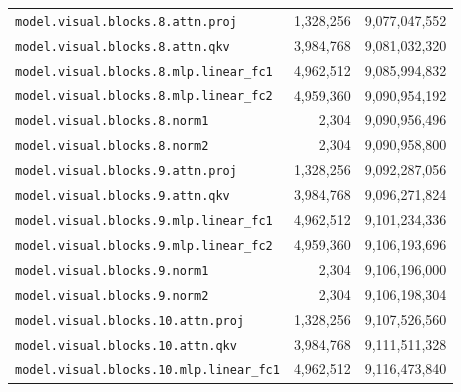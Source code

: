 \documentclass[10pt,a4paper]{article}
\theoremstyle{definition}
\begin{document}
\begin{appendices}
\begin{longtable}{p{9.5cm}rr}
\texttt{model.\allowbreak{}visual.\allowbreak{}blocks.\allowbreak{}8.\allowbreak{}attn.\allowbreak{}proj} & 1,328,256 & 9,077,047,552 \\
\texttt{model.\allowbreak{}visual.\allowbreak{}blocks.\allowbreak{}8.\allowbreak{}attn.\allowbreak{}qkv} & 3,984,768 & 9,081,032,320 \\
\texttt{model.\allowbreak{}visual.\allowbreak{}blocks.\allowbreak{}8.\allowbreak{}mlp.\allowbreak{}linear\_fc1} & 4,962,512 & 9,085,994,832 \\
\texttt{model.\allowbreak{}visual.\allowbreak{}blocks.\allowbreak{}8.\allowbreak{}mlp.\allowbreak{}linear\_fc2} & 4,959,360 & 9,090,954,192 \\
\texttt{model.\allowbreak{}visual.\allowbreak{}blocks.\allowbreak{}8.\allowbreak{}norm1} & 2,304 & 9,090,956,496 \\
\texttt{model.\allowbreak{}visual.\allowbreak{}blocks.\allowbreak{}8.\allowbreak{}norm2} & 2,304 & 9,090,958,800 \\
\texttt{model.\allowbreak{}visual.\allowbreak{}blocks.\allowbreak{}9.\allowbreak{}attn.\allowbreak{}proj} & 1,328,256 & 9,092,287,056 \\
\texttt{model.\allowbreak{}visual.\allowbreak{}blocks.\allowbreak{}9.\allowbreak{}attn.\allowbreak{}qkv} & 3,984,768 & 9,096,271,824 \\
\texttt{model.\allowbreak{}visual.\allowbreak{}blocks.\allowbreak{}9.\allowbreak{}mlp.\allowbreak{}linear\_fc1} & 4,962,512 & 9,101,234,336 \\
\texttt{model.\allowbreak{}visual.\allowbreak{}blocks.\allowbreak{}9.\allowbreak{}mlp.\allowbreak{}linear\_fc2} & 4,959,360 & 9,106,193,696 \\
\texttt{model.\allowbreak{}visual.\allowbreak{}blocks.\allowbreak{}9.\allowbreak{}norm1} & 2,304 & 9,106,196,000 \\
\texttt{model.\allowbreak{}visual.\allowbreak{}blocks.\allowbreak{}9.\allowbreak{}norm2} & 2,304 & 9,106,198,304 \\
\texttt{model.\allowbreak{}visual.\allowbreak{}blocks.\allowbreak{}10.\allowbreak{}attn.\allowbreak{}proj} & 1,328,256 & 9,107,526,560 \\
\texttt{model.\allowbreak{}visual.\allowbreak{}blocks.\allowbreak{}10.\allowbreak{}attn.\allowbreak{}qkv} & 3,984,768 & 9,111,511,328 \\
\texttt{model.\allowbreak{}visual.\allowbreak{}blocks.\allowbreak{}10.\allowbreak{}mlp.\allowbreak{}linear\_fc1} & 4,962,512 & 9,116,473,840 \\

\end{longtable}
\end{appendices}
\end{document}
